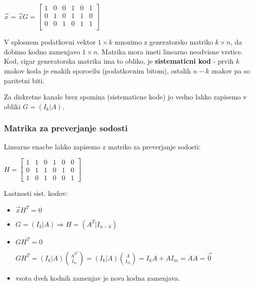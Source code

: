 \documentclass{article}
\begin{document}
\begin{multicols}{2}
	\begin{center}
		\begin{math}
			\vec{x} = \vec{z}G =
			\begin{bmatrix}
				1 & 0 & 0 & 1 & 0 & 1 \\
				0 & 1 & 0 & 1 & 1 & 0 \\
				0 & 0 & 1 & 0 & 1 & 1 \\
			\end{bmatrix}
		\end{math}
	\end{center}

	V splosnem podatkovni vektor $1 \times k$ mnozimo z generatorsko matriko $k \times n$, da dobimo kodno zamenjavo
	$1 \times n$. Matrika mora imeti linearno neodvisne vrstice. Kod, cigar generatorska matrika ima to obliko, je
	\textbf{sistematicni kod} - prvih $k$ znakov koda je enakih sporocilu (podatkovnim bitom), ostalih $n-k$ znakov pa so
	paritetni biti.

	Za diskretne kanale brez spomina (sistematicne kode) jo vedno lahko zapisemo v obliki $G = (I_k | A)$.

	\subsubsection{Matrika za preverjanje sodosti}
	Linearne enacbe lahko zapisemo z matriko za preverjanje sodosti:

	\begin{center}
		\begin{math}
			H =
			\begin{bmatrix}
				1 & 1 & 0 & 1 & 0 & 0 \\
				0 & 1 & 1 & 0 & 1 & 0 \\
				1 & 0 & 1 & 0 & 0 & 1
			\end{bmatrix}
		\end{math}
	\end{center}
	Lastnosti sist. kodov:
	\begin{itemize}
		\item $\vec{x}H^T = 0$
		\item $G = (I_k | A) \Rightarrow H = (A^T | I_{n-k})$
		\item $GH^T = 0$
		      \begin{center}
			      \begin{math}
				      GH^T = (I_k | A) {A^{T^{T}} \choose I_m} = (I_k | A) {A \choose I_m} = I_k A + A I_m = AA = \vec{0}
			      \end{math}
		      \end{center}
		\item vsota dveh kodnih zamenjav je nova kodna zamenjava.
	\end{itemize}


\end{multicols}
\end{document}
